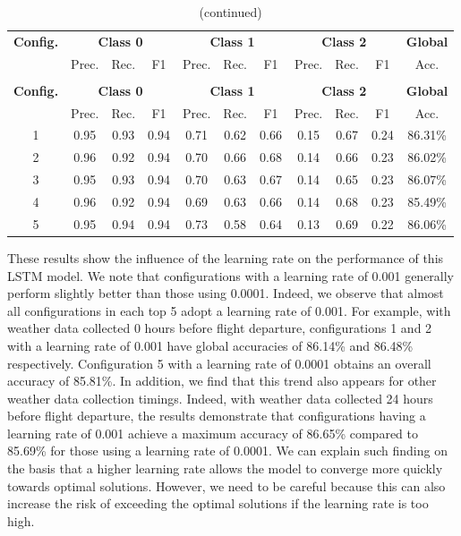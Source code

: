 \documentclass[12pt,oneside]{book} %
\begin{document}
\setlength\LTleft{1cm}
\begin{longtable}{ c ccc ccc ccc c}
\caption{\centering Performance metrics of the LSTM model for the top 5 configurations with weather data collected at 48h before flight departure} \\
\toprule
\textbf{Config.} & \multicolumn{3}{c}{\textbf{Class 0}} & \multicolumn{3}{c}{\textbf{Class 1}} & \multicolumn{3}{c}{\textbf{Class 2}} & \textbf{Global} \\
               & Prec. & Rec. & F1  & Prec. & Rec. & F1   & Prec. & Rec. & F1  & Acc. \\
\midrule
\endfirsthead

\caption[]{(continued)} \\
\toprule
\textbf{Config.} & \multicolumn{3}{c}{\textbf{Class 0}} & \multicolumn{3}{c}{\textbf{Class 1}} & \multicolumn{3}{c}{\textbf{Class 2}} & \textbf{Global} \\
               & Prec. & Rec. & F1  & Prec. & Rec. & F1   & Prec. & Rec. & F1  & Acc. \\
\midrule
\endhead

\bottomrule
\endfoot

\bottomrule
\endlastfoot

1 & 0.95 & 0.93 & 0.94 & 0.71 & 0.62 & 0.66 & 0.15 & 0.67 & 0.24 & 86.31\%
\\
2 & 0.96 & 0.92 & 0.94 & 0.70 & 0.66 & 0.68 & 0.14 & 0.66 & 0.23 & 86.02\%
\\
3 & 0.95 & 0.93 & 0.94 & 0.70 & 0.63 & 0.67 & 0.14 & 0.65 & 0.23 & 86.07\%
\\
4 & 0.96 & 0.92 & 0.94 & 0.69 & 0.63 & 0.66 & 0.14 & 0.68 & 0.23 & 85.49\%
\\
5 & 0.95 & 0.94 & 0.94 & 0.73 & 0.58 & 0.64 & 0.13 & 0.69 & 0.22 & 86.06\%
\\

\end{longtable}

\noindent These results show the influence of the learning rate on the performance of this LSTM model. We note that configurations with a learning rate of 0.001 generally perform slightly better than those using 0.0001. Indeed, we observe that almost all configurations in each top 5 adopt a learning rate of 0.001. For example, with weather data collected 0 hours before flight departure, configurations 1 and 2 with a learning rate of 0.001 have global accuracies of 86.14\% and 86.48\% respectively. Configuration 5 with a learning rate of 0.0001 obtains an overall accuracy of 85.81\%. In addition, we find that this trend also appears for other weather data collection timings. Indeed, with weather data collected 24 hours before flight departure, the results demonstrate that configurations having a learning rate of 0.001 achieve a maximum accuracy of 86.65\% compared to 85.69\% for those using a learning rate of 0.0001. We can explain such finding on the basis that a higher learning rate allows the model to converge more quickly towards optimal solutions. However, we need to be careful because this can also increase the risk of exceeding the optimal solutions if the learning rate is too high.
\end{document}
